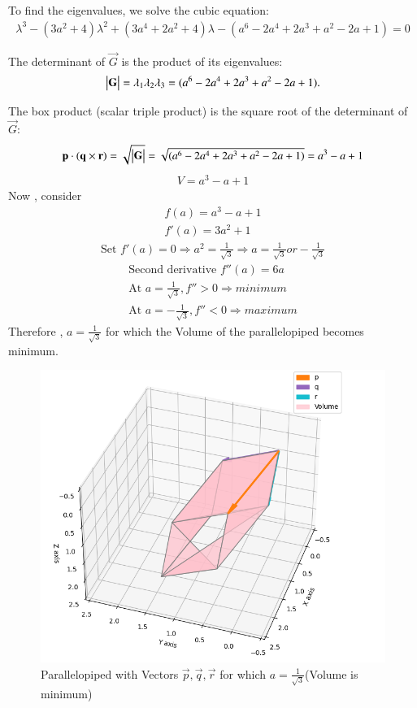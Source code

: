 \documentclass[journal]{IEEEtran}
\begin{document}
To find the eigenvalues, we solve the cubic equation:
\begin{align*}
\lambda^3 - (3a^2+4)\lambda^2 + (3a^4+2a^2+4)\lambda - (a^6-2a^4+2a^3+a^2-2a+1) = 0
\end{align*}

The determinant of $ \vec{G} $ is the product of its eigenvalues:
\begin{align}
\begin{vmatrix}\mathbf{G}\end{vmatrix} = \lambda_1 \lambda_2 \lambda_3 = (a^6-2a^4+2a^3+a^2-2a+1).
\end{align}


The box product (scalar triple product) is the square root of the determinant of \( \vec{G} \):
\begin{align}
\mathbf{p} \cdot (\mathbf{q} \times \mathbf{r}) = \sqrt{\begin{vmatrix}\mathbf{G}\end{vmatrix}} = \sqrt{(a^6-2a^4+2a^3+a^2-2a+1)} = a^3-a+1
\end{align}
\begin{align}
    V=a^3-a+1
\end{align}
Now , consider
\begin{align}
    f(a)=a^3-a+1\\
    f'(a)=3a^2+1
\end{align}
\begin{align*}
\text{Set }f'(a)=0  \Rightarrow a^2=\frac{1}{\sqrt{3}} \Rightarrow a=\frac{1}{\sqrt{3}} or -\frac{1}{\sqrt{3}} 
\end{align*}
\begin{align}
\text{Second derivative }f''(a)=6a\\
\text{At }a=\frac{1}{\sqrt{3}},f''>0 \Rightarrow minimum\\
\text{At }a=-\frac{1}{\sqrt{3}},f''<0 \Rightarrow maximum
\end{align}
Therefore , $a=\frac{1}{\sqrt{3}}$ for which the Volume of the parallelopiped becomes minimum.
\begin{figure}[h!]
  \centering
  \includegraphics[width=0.7\columnwidth]{figs/fig.png} 
   \caption*{Parallelopiped with Vectors $\vec{p},\vec{q},\vec{r}$ for which $a=\frac{1}{\sqrt{3}}$(Volume is minimum)}
  \label{Fig1}
\end{figure}
\end{document}

